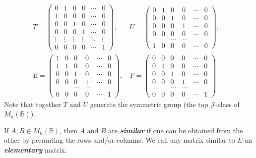 \documentclass[11pt]{article}
\newcommand{\defn}[1]{\textbf{\textit{#1}}}
\numberwithin{equation}{section}
\newcommand{\B}{\mathbb{B}}
\newcommand{\Bn}{M_n(\B)}
\newcommand{\J}{\mathscr{J}}
\begin{document}
\begin{align*}
  T = \begin{pmatrix}
    0 & 1 & 0 & 0 & \cdots & 0 \\
    1 & 0 & 0 & 0 & \cdots & 0 \\
    0 & 0 & 1 & 0 & \cdots & 0 \\
    0 & 0 & 0 & 1 & \cdots & 0 \\
    \vdots  & \vdots & \vdots & \vdots & \ddots & \vdots\\
    0 & 0 & 0 & 0 & \cdots & 1 
  \end{pmatrix}\text{, }&
  U = \begin{pmatrix}
    0 & 1 & 0 & 0 & \cdots & 0 \\
    0 & 0 & 1 & 0 & \cdots & 0 \\
    0 & 0 & 0 & 1 & \cdots & 0 \\
    0 & 0 & 0 & 0 & \cdots & 0 \\
      &   &   \dots & \dots & \\
    1 & 0 & 0 & 0 & \cdots & 0 
  \end{pmatrix},&\\
  E = \begin{pmatrix}
    1 & 0 & 0 & 0 & \cdots & 0 \\
    1 & 1 & 0 & 0 & \cdots & 0 \\
    0 & 0 & 1 & 0 & \cdots & 0 \\
    0 & 0 & 0 & 1 & \cdots & 0 \\
      &   &   \dots & \dots & \\
    0 & 0 & 0 & 0 & \cdots & 1 
  \end{pmatrix}\text{, }&
  F = \begin{pmatrix}
    0 & 0 & 0 & 0 & \cdots & 0 \\
    0 & 1 & 0 & 0 & \cdots & 0 \\
    0 & 0 & 1 & 0 & \cdots & 0 \\
    0 & 0 & 0 & 1 & \cdots & 0 \\
      &   &   \dots & \dots & \\
    0 & 0 & 0 & 0 & \cdots & 1
  \end{pmatrix}
\end{align*}
Note that together $T$ and $U$ generate the symmetric group (the top
$\J$-class of $\Bn$). 

If $A, B\in \Bn$, then $A$ and $B$ are \defn{similar} if 
one can be obtained from the other by permuting the rows and/or columns.
We call any matrix similar to $E$ an \defn{elementary} matrix.
\end{document}
